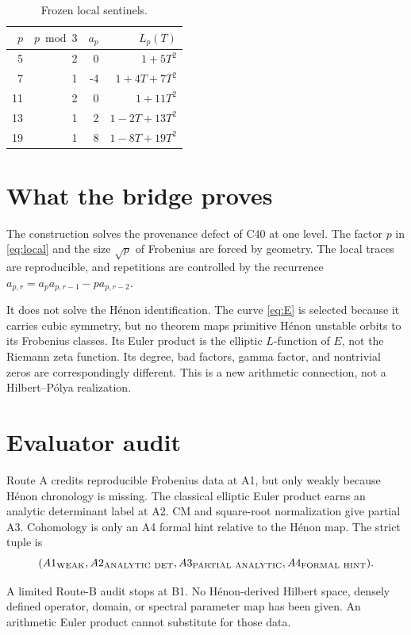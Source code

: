 \documentclass[11pt]{article}
\theoremstyle{remark}\newtheorem{remark}[theorem]{Remark}
\begin{document}
\begin{table}[h]
\centering
\caption{Frozen local sentinels.}
\begin{tabular}{rrrr}
\toprule
\(p\)&\(p\bmod3\)&\(a_p\)&\(L_p(T)\)\\\midrule
5&2&0&\(1+5T^2\)\\
7&1&-4&\(1+4T+7T^2\)\\
11&2&0&\(1+11T^2\)\\
13&1&2&\(1-2T+13T^2\)\\
19&1&8&\(1-8T+19T^2\)\\
\bottomrule
\end{tabular}
\end{table}

\section{What the bridge proves}
The construction solves the provenance defect of C40 at one level.  The
factor \(p\) in \eqref{eq:local} and the size \(\sqrt p\) of Frobenius are
forced by geometry.  The local traces are reproducible, and repetitions are
controlled by the recurrence
\(a_{p,r}=a_pa_{p,r-1}-pa_{p,r-2}\).

It does not solve the H\'enon identification.  The curve \eqref{eq:E} is
selected because it carries cubic symmetry, but no theorem maps primitive
H\'enon unstable orbits to its Frobenius classes.  Its Euler product is the
elliptic \(L\)-function of \(E\), not the Riemann zeta function.  Its degree,
bad factors, gamma factor, and nontrivial zeros are correspondingly
different.  This is a new arithmetic connection, not a Hilbert--P\'olya
realization.

\section{Evaluator audit}
Route A credits reproducible Frobenius data at A1, but only weakly because
H\'enon chronology is missing.  The classical elliptic Euler product earns
an analytic determinant label at A2.  CM and square-root normalization give
partial A3.  Cohomology is only an A4 formal hint relative to the H\'enon
map.  The strict tuple is
\[
(A1_{\rm WEAK},A2_{\rm ANALYTIC\ DET},
A3_{\rm PARTIAL\ ANALYTIC},A4_{\rm FORMAL\ HINT}).
\]

A limited Route-B audit stops at B1.  No H\'enon-derived Hilbert space,
densely defined operator, domain, or spectral parameter map has been given.
An arithmetic Euler product cannot substitute for those data.
\end{document}
